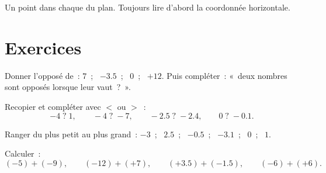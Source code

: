 \begin{omfigure}

{\small Un point dans chaque  du plan. Toujours lire d'abord la
coordonnée horizontale.}
\end{omfigure}

\section{Exercices}

\begin{exercise}[$\star$]\label{exo:g7:negatives:1}
Donner l'opposé de~: $7$~; \ $-3.5$~; \ $0$~; \ $+12$. Puis
compléter~: «~deux nombres sont opposés lorsque leur 
vaut~?~».
\end{exercise}

\begin{exercise}[$\star$]\label{exo:g7:negatives:2}
Recopier et compléter avec $<$ ou $>$~:
\[
-4 \;?\; 1, \qquad
-4 \;?\; -7, \qquad
-2.5 \;?\; -2.4, \qquad
0 \;?\; -0.1 .
\]
\end{exercise}

\begin{exercise}[$\star$]\label{exo:g7:negatives:3}
Ranger du plus petit au plus grand~: $-3$~; \ $2.5$~; \ $-0.5$~;
\ $-3.1$~; \ $0$~; \ $1$.
\end{exercise}

\begin{exercise}[$\star$]\label{exo:g7:negatives:4}
Calculer~:
\[
(-5) + (-9), \qquad
(-12) + (+7), \qquad
(+3.5) + (-1.5), \qquad
(-6) + (+6).
\]
\end{exercise}

